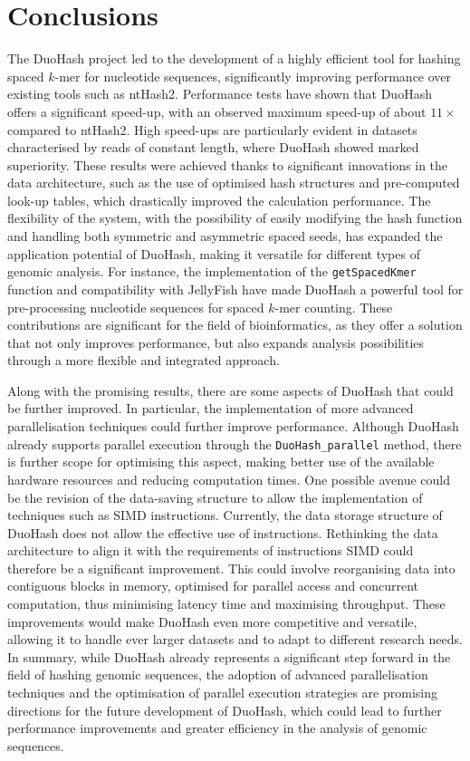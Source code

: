\chapter{Conclusions}
\label{chp:conclusions}

The DuoHash project led to the development of a highly efficient tool for hashing spaced $k$-mer for nucleotide sequences, significantly improving performance over existing tools such as ntHash2. Performance tests have shown that DuoHash offers a significant speed-up, with an observed maximum speed-up of about $11\times$ compared to ntHash2. High speed-ups are particularly evident in datasets characterised by reads of constant length, where DuoHash showed marked superiority. These results were achieved thanks to significant innovations in the data architecture, such as the use of optimised hash structures and pre-computed look-up tables, which drastically improved the calculation performance. The flexibility of the system, with the possibility of easily modifying the hash function and handling both symmetric and asymmetric spaced seeds, has expanded the application potential of DuoHash, making it versatile for different types of genomic analysis. For instance, the implementation of the \verb|getSpacedKmer| function and compatibility with JellyFish have made DuoHash a powerful tool for pre-processing nucleotide sequences for spaced $k$-mer counting. These contributions are significant for the field of bioinformatics, as they offer a solution that not only improves performance, but also expands analysis possibilities through a more flexible and integrated approach. 

Along with the promising results, there are some aspects of DuoHash that could be further improved. In particular, the implementation of more advanced parallelisation techniques could further improve performance. Although DuoHash already supports parallel execution through the \verb|DuoHash_parallel| method, there is further scope for optimising this aspect, making better use of the available hardware resources and reducing computation times. One possible avenue could be the revision of the data-saving structure to allow the implementation of techniques such as \ac{SIMD} instructions. Currently, the data storage structure of DuoHash does not allow the effective use of instructions. Rethinking the data architecture to align it with the requirements of instructions \acs{SIMD} could therefore be a significant improvement. This could involve reorganising data into contiguous blocks in memory, optimised for parallel access and concurrent computation, thus minimising latency time and maximising throughput. These improvements would make DuoHash even more competitive and versatile, allowing it to handle ever larger datasets and to adapt to different research needs. In summary, while DuoHash already represents a significant step forward in the field of hashing genomic sequences, the adoption of advanced parallelisation techniques and the optimisation of parallel execution strategies are promising directions for the future development of DuoHash, which could lead to further performance improvements and greater efficiency in the analysis of genomic sequences.
